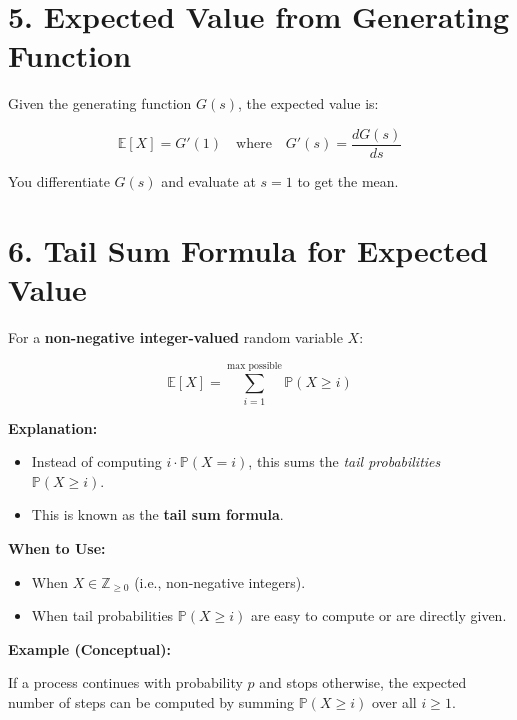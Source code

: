 \documentclass[12pt]{article}
\begin{document}
\section*{5. Expected Value from Generating Function}

Given the generating function \( G(s) \), the expected value is:

\[
\mathbb{E}[X] = G'(1)
\quad \text{where} \quad
G'(s) = \frac{dG(s)}{ds}
\]

You differentiate \( G(s) \) and evaluate at \( s = 1 \) to get the mean.

\section*{6. Tail Sum Formula for Expected Value}

For a \textbf{non-negative integer-valued} random variable \( X \):

\[
\mathbb{E}[X] = \sum_{i=1}^{\text{max possible}} \mathbb{P}(X \geq i)
\]

\textbf{Explanation:}
\begin{itemize}
  \item Instead of computing \( i \cdot \mathbb{P}(X = i) \), this sums the \emph{tail probabilities} \( \mathbb{P}(X \ge i) \).
  \item This is known as the \textbf{tail sum formula}.
\end{itemize}

\textbf{When to Use:}
\begin{itemize}
  \item When \( X \in \mathbb{Z}_{\ge 0} \) (i.e., non-negative integers).
  \item When tail probabilities \( \mathbb{P}(X \ge i) \) are easy to compute or are directly given.
\end{itemize}

\textbf{Example (Conceptual):}

If a process continues with probability \( p \) and stops otherwise, the expected number of steps can be computed by summing \( \mathbb{P}(X \ge i) \) over all \( i \ge 1 \).
\end{document}
